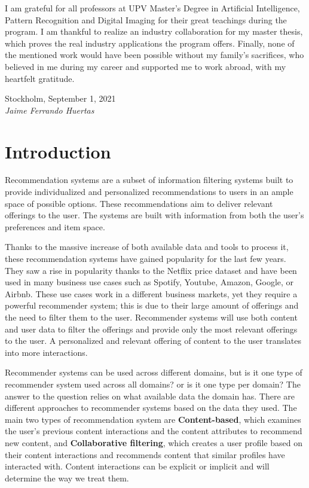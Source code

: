 \documentclass{tex_files/kththesis}
\begin{document}
I am grateful for all professors at UPV Master's Degree in Artificial Intelligence, Pattern Recognition and Digital Imaging for their great teachings during the program. I am thankful to realize an industry collaboration for my master thesis, which proves the real industry applications the program offers. Finally, none of the mentioned work would have been possible without my family's sacrifices, who believed in me during my career and supported me to work abroad, with my heartfelt gratitude.
\newline
\newline
\newline
\newline
\newline

\noindent Stockholm, September 1, 2021 \\
\noindent \textit{Jaime Ferrando Huertas}

\chapter{Introduction}

Recommendation systems are a subset of information filtering systems built to provide individualized and personalized recommendations to users in an ample space of possible options. These recommendations aim to deliver relevant offerings to the user. The systems are built with information from both the user's preferences and item space.

Thanks to the massive increase of both available data and tools to process it, these recommendation systems have gained popularity for the last few years. They saw a rise in popularity thanks to the Netflix price dataset \cite{netflix} and have been used in many business use cases such as Spotify, Youtube, Amazon, Google, or Airbnb. These use cases work in a different business markets, yet they require a powerful recommender system; this is due to their large amount of offerings and the need to filter them to the user. Recommender systems will use both content and user data to filter the offerings and provide only the most relevant offerings to the user. A personalized and relevant offering of content to the user translates into more interactions.

Recommender systems can be used across different domains, but is it one type of recommender system used across all domains? or is it one type per domain? The answer to the question relies on what available data the domain has. There are different approaches to recommender systems based on the data they used. The main two types of recommendation system are \textbf{Content-based}, which examines the user's previous content interactions and the content attributes to recommend new content, and \textbf{Collaborative filtering}, which creates a user profile based on their content interactions and recommends content that similar profiles have interacted with. Content interactions can be explicit or implicit and will determine the way we treat them.
\end{document}
